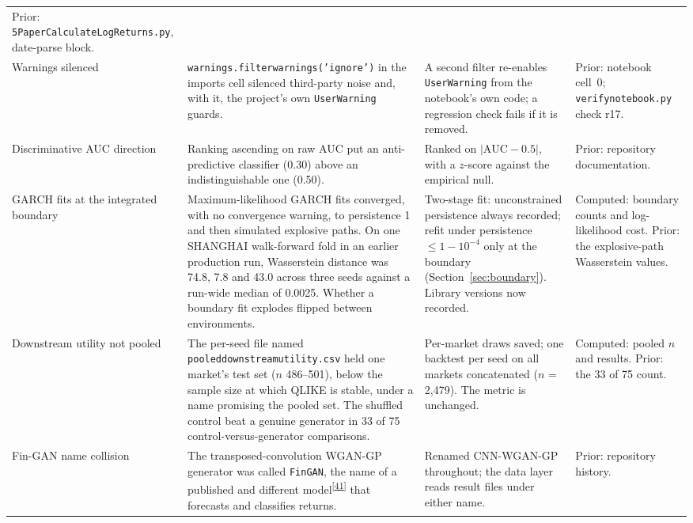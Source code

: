 \documentclass[11pt,a4paper]{article}
\makeatletter
\newcommand{\tcite}[1]{\textsuperscript{[\hyperlink{R:#1}{#1}]}}
\DeclareRobustCommand{\_}{\ifmmode\nfss@text{\textunderscore}\else\textunderscore\allowbreak\fi}
\makeatother
\begin{document}
{\begin{xltabular}{\linewidth}{@{}>{\raggedright\arraybackslash}p{3.0cm} >{\raggedright\arraybackslash}X >{\raggedright\arraybackslash}p{3.3cm} >{\raggedright\arraybackslash}p{2.6cm}@{}}
Prior: \texttt{5\_Paper\_Calculate\_LogReturns.py}, date-parse block. \\
\addlinespace
Warnings silenced &
\texttt{warnings.\allowbreak filterwarnings('ignore')} in the imports cell silenced third-party noise and, with it, the project's own \texttt{UserWarning} guards. &
A second filter re-enables \texttt{UserWarning} from the notebook's own code; a regression check fails if it is removed. &
Prior: notebook cell~0; \texttt{verify\_notebook.py} check r17. \\
\addlinespace
Discriminative AUC direction &
Ranking ascending on raw AUC put an anti-predictive classifier (0.30) above an indistinguishable one (0.50). &
Ranked on $|\mathrm{AUC}-0.5|$, with a $z$-score against the empirical null. &
Prior: repository documentation. \\
\addlinespace
GARCH fits at the integrated boundary &
Maximum-likelihood GARCH fits converged, with no convergence warning, to persistence 1 and then simulated explosive paths. On one SHANGHAI walk-forward fold in an earlier production run, Wasserstein distance was 74.8, 7.8 and 43.0 across three seeds against a run-wide median of 0.0025. Whether a boundary fit explodes flipped between environments. &
Two-stage fit: unconstrained persistence always recorded; refit under persistence $\le1-10^{-4}$ only at the boundary (Section~\ref{sec:boundary}). Library versions now recorded. &
Computed: boundary counts and log-likelihood cost. Prior: the explosive-path Wasserstein values. \\
\addlinespace
Downstream utility not pooled &
The per-seed file named \texttt{pooled\_downstream\_utility.csv} held one market's test set ($n$ 486--501), below the sample size at which QLIKE is stable, under a name promising the pooled set. The shuffled control beat a genuine generator in 33 of 75 control-versus-generator comparisons. &
Per-market draws saved; one backtest per seed on all markets concatenated ($n$ = 2,479). The metric is unchanged. &
Computed: pooled $n$ and results. Prior: the 33 of 75 count. \\
\addlinespace
Fin-GAN name collision &
The transposed-convolution WGAN-GP generator was called \texttt{FinGAN}, the name of a published and different model\tcite{41} that forecasts and classifies returns. &
Renamed CNN-WGAN-GP throughout; the data layer reads result files under either name. &
Prior: repository history. \\
\end{xltabular}
}
\end{document}
